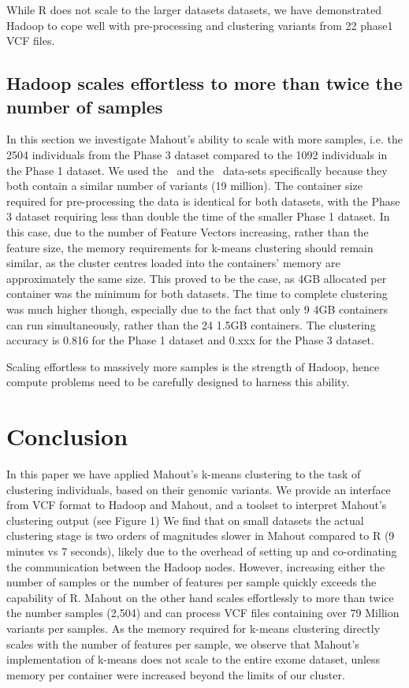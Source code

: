 \documentclass{bioinfo}
\begin{document}
While R does not scale to the larger datasets datasets, we have demonstrated Hadoop to cope well with pre-processing and clustering variants from 22 phase1 VCF files.

\subsection*{Hadoop scales effortless to more than twice the number of samples}
In this section we investigate Mahout's ability to scale with more samples, i.e. the 2504 individuals from the Phase 3 dataset compared to the 1092 individuals in the Phase 1 dataset.
We used the \SevenPhaseone\ and the \ThreePhasethree\ data-sets specifically because they both contain a similar number of variants (19 million).
The container size required for pre-processing the data is identical for both datasets, with the Phase 3 dataset requiring less than double the time of the smaller Phase 1 dataset.
In this case, due to the number of Feature Vectors increasing, rather than the feature size, the memory requirements for k-means clustering should remain similar, as the cluster centres loaded into the containers' memory are approximately the same size.
This proved to be the case, as 4GB allocated per container was the minimum for both datasets. The time to complete clustering was much higher though,
especially due to the fact that only 9 4GB containers can run simultaneously, rather than the 24 1.5GB containers. 
The clustering accuracy is 0.816 for the Phase 1 dataset and 0.xxx for the Phase 3 dataset.

Scaling effortless to massively more samples is the strength of Hadoop, hence compute problems need to be carefully designed to harness this ability.  


\section*{Conclusion}
In this paper we have applied Mahout's k-means clustering to the task of clustering individuals, based on their genomic variants. 
We provide an interface from VCF format to Hadoop and Mahout, and a toolset to interpret Mahout's clustering output (see Figure 1)
We find that on small datasets the actual clustering stage is two orders of magnitudes slower in Mahout compared to R (9 minutes vs 7 seconds), likely due to the overhead of setting up and co-ordinating the communication between the Hadoop nodes. 
However, increasing either the number of samples or the number of features per sample quickly exceeds the capability of R.
Mahout on the other hand scales effortlessly to more than twice the number samples (2,504) and can process VCF files containing over 79 Million variants per samples.
As the memory required for k-means clustering directly scales with the number of features per sample, we observe that Mahout's implementation
of k-means does not scale to the entire exome dataset, unless memory per container were increased beyond the limits of our cluster.
\end{document}
